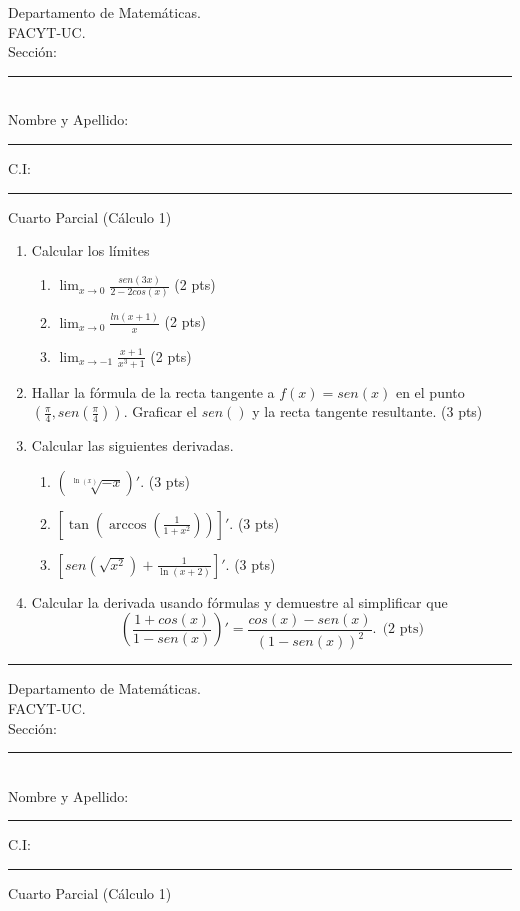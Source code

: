 \documentclass[12pt,letterpaper]{article}
\begin{document}
\pagestyle{empty}
\begin{flushleft}
Departamento de Matem\'aticas.\\
FACYT-UC.\\

\mbox{}\hfill Secci\'on:\rule{1cm}{0.4pt}\\
Nombre y Apellido: \rule{5cm}{0.4pt} \hfill
C.I: \rule{3cm}{0.4pt}
\end{flushleft}
\begin{center}
{\Large Cuarto Parcial (C\'alculo 1)}
\end{center}

\begin{enumerate}
\item Calcular los límites
\begin{enumerate}
\item $\lim_{x\to 0}  \frac{sen(3x)}{2-2cos(x)}$ (2 pts)
\item $\lim_{x\to 0} \frac{ln(x+1)}{x}$ (2 pts)
\item $\lim_{x\to -1} \frac{x+1}{x^3+1}$ (2 pts)
\end{enumerate}
\item  Hallar la f\'ormula de la recta tangente a $f(x)=sen(x)$
en el punto $(\frac{\pi}{4},sen(\frac{\pi}{4}))$. Graficar el $sen()$ y la recta tangente resultante. (3 pts)
\item Calcular las siguientes derivadas. 
\begin{enumerate}
\item $(\sqrt[\ln(x)]{-x})'$. (3 pts)
\item $[\tan\left(\arccos(\frac{1}{1+x^2})\right)]'$. (3 pts)
\item $[sen(\sqrt{x^2})+\frac{1}{\ln(x+2)}]'$. (3 pts)
\end{enumerate}
\item Calcular la derivada usando fórmulas y demuestre al simplificar que 
$$
\left(\frac{1+cos(x)}{1-sen(x)}\right)'=\frac{cos(x)-sen(x)}{(1-sen(x))^2}.\ \ \mbox{(2 pts)} $$
\end{enumerate}

\rule{2\linewidth}{0.4pt}

\begin{flushleft}
  Departamento de Matem\'aticas.\\
  FACYT-UC.\\
  
  \mbox{}\hfill Secci\'on:\rule{1cm}{0.4pt}\\
  Nombre y Apellido: \rule{5cm}{0.4pt} \hfill
  C.I: \rule{3cm}{0.4pt}
  \end{flushleft}
  \begin{center}
  {\Large Cuarto Parcial (C\'alculo 1)}
  \end{center}
  
\end{document}
